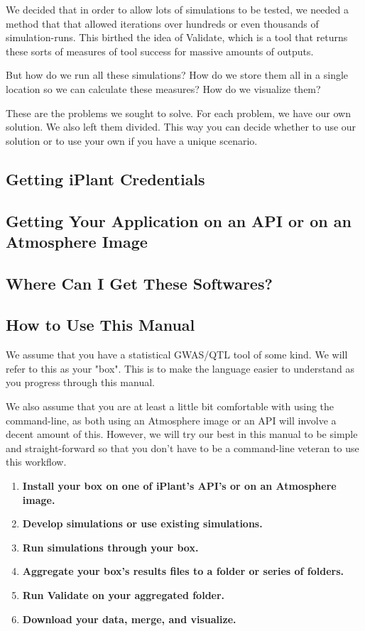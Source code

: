 \documentclass[twoside,a4paper]{refart}
\begin{document}
We decided that in order to allow lots of simulations to be tested, we needed a method that that allowed iterations over hundreds or even thousands of simulation-runs. This birthed the idea of Validate, which is a tool that returns these sorts of measures of tool success for massive amounts of outputs.

But how do we run all these simulations? How do we store them all in a single location so we can calculate these measures? How do we visualize them?

These are the problems we sought to solve. For each problem, we have our own solution. We also left them divided. This way you can decide whether to use our solution or to use your own if you have a unique scenario.

\subsection{Getting iPlant Credentials}

\subsection{Getting Your Application on an API or on an Atmosphere Image}

\subsection{Where Can I Get These Softwares?}

\subsection{How to Use This Manual}
We assume that you have a statistical GWAS/QTL tool of some kind. We will refer to this as your "box". This is to make the language easier to understand as you progress through this manual.

We also assume that you are at least a little bit comfortable with using the command-line, as both using an Atmosphere image or an API will involve a decent amount of this. However, we will try our best in this manual to be simple and straight-forward so that you don't have to be a command-line veteran to use this workflow.

\begin{enumerate}
\item \textbf{Install your box on one of iPlant's API's or on an Atmosphere image.}
\item \textbf{Develop simulations or use existing simulations.}
\item \textbf{Run simulations through your box.}
\item \textbf{Aggregate your box's results files to a folder or series of folders.}
\item \textbf{Run Validate on your aggregated folder.}
\item \textbf{Download your data, merge, and visualize.}
\end{enumerate}
\end{document}
